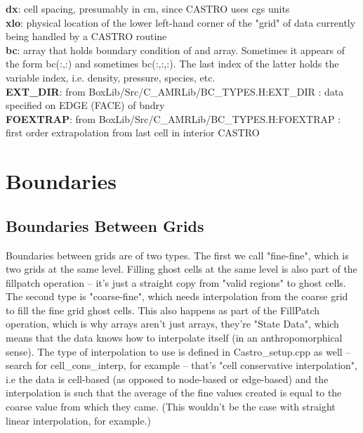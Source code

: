 {\bf dx}: cell spacing, presumably in cm, since CASTRO uses cgs units\\

{\bf xlo}: physical location of the lower left-hand corner of the "grid" of data currently being handled by a CASTRO routine\\

{\bf bc}: array that holds boundary condition of and array. Sometimes it appears of the form bc(:,:) and sometimes bc(:,:,:). The last index of the latter holds the variable index, i.e. density, pressure, species, etc.\\

{\bf EXT\_DIR}: from  BoxLib/Src/C\_AMRLib/BC\_TYPES.H:EXT\_DIR  : data specified on EDGE (FACE) of bndry\\

{\bf FOEXTRAP}: from  BoxLib/Src/C\_AMRLib/BC\_TYPES.H:FOEXTRAP  : first order extrapolation from last cell in interior CASTRO 

\section{Boundaries}
\subsection{Boundaries Between Grids}
Boundaries between grids are of two types. The first we call "fine-fine", which is two grids at the same level. 
Filling ghost cells at the same level is also part of the fillpatch operation -- it's just a straight copy from "valid regions" 
to ghost cells. The second type is "coarse-fine", which needs interpolation from the coarse grid to fill the fine grid ghost cells. 
This also happens as part of the FillPatch operation, which is why arrays aren't just arrays, they're "State Data", 
which means that the data knows how to interpolate itself (in an anthropomorphical sense). 
The type of interpolation to use is defined in Castro\_setup.cpp as well -- search for cell\_cons\_interp, for example -- 
that's "cell conservative interpolation", i.e the data is cell-based (as opposed to node-based or edge-based) and the 
interpolation is such that the average of the fine values created is equal to the coarse value from which they came. 
(This wouldn't be the case with straight linear interpolation, for example.) 

